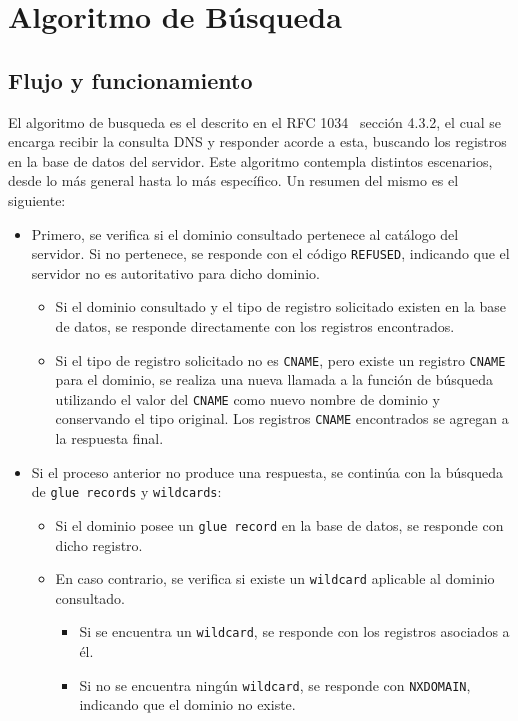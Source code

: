 \chapter{Algoritmo de Búsqueda}

\section{Flujo y funcionamiento}

El algoritmo de busqueda es el descrito en el RFC 1034~\cite{RFC1034} sección 4.3.2, el cual se encarga recibir la consulta DNS y responder acorde a esta, buscando los registros en la base de datos del servidor.
Este algoritmo contempla distintos escenarios, desde lo más general hasta lo más específico. Un resumen del mismo es el siguiente:

\begin{itemize}
    \item Primero, se verifica si el dominio consultado pertenece al catálogo del servidor.  
    Si no pertenece, se responde con el código \texttt{REFUSED}, indicando que el servidor no es autoritativo para dicho dominio.
    \begin{itemize}
        \item Si el dominio consultado y el tipo de registro solicitado existen en la base de datos, se responde directamente con los registros encontrados.
        \item Si el tipo de registro solicitado no es \texttt{CNAME}, pero existe un registro \texttt{CNAME} para el dominio, se realiza una nueva llamada a la función de búsqueda utilizando el valor del \texttt{CNAME} como nuevo nombre de dominio y conservando el tipo original.  
        Los registros \texttt{CNAME} encontrados se agregan a la respuesta final.
    \end{itemize}

    \item Si el proceso anterior no produce una respuesta, se continúa con la búsqueda de \texttt{glue records} y \texttt{wildcards}:
    \begin{itemize}
        \item Si el dominio posee un \texttt{glue record} en la base de datos, se responde con dicho registro.
        \item En caso contrario, se verifica si existe un \texttt{wildcard} aplicable al dominio consultado.
        \begin{itemize}
            \item Si se encuentra un \texttt{wildcard}, se responde con los registros asociados a él.
            \item Si no se encuentra ningún \texttt{wildcard}, se responde con \texttt{NXDOMAIN}, indicando que el dominio no existe.
        \end{itemize}
    \end{itemize}
\end{itemize}

